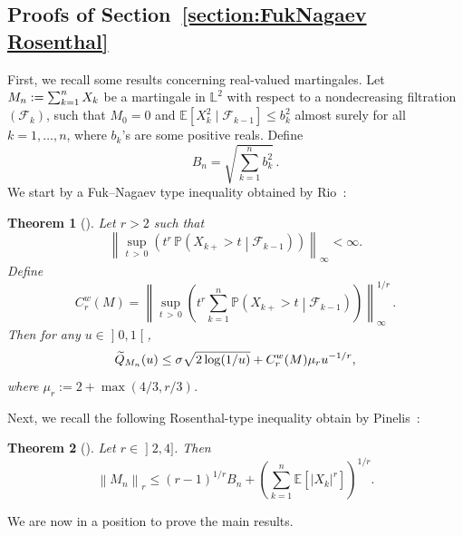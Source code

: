 \documentclass[10pt]{amsart}
\newtheorem{theo}{Theorem}[section]
\theoremstyle{definition}\newtheorem{defi}[theo]{Definition}\newtheorem{rema}[theo]{Remark}\newtheorem{exam}[theo]{Example}\newtheorem{exem}[theo]{Example}\newtheorem{nota}[theo]{Notation}
\newcommand{\bE}{\mathbb{E}}
\newcommand{\bL}{\mathbb{L}}
\newcommand{\bP}{\mathbb{P}}
\newcommand{\cF}{\mathcal{F}}
\newcommand{\intervalleoo}[2]{\mathopen{]} #1\mathclose{}\mathpunct{},#2\mathclose{[}}
\newcommand{\intervalleof}[2]{\mathopen{]} #1\mathclose{}\mathpunct{},#2\mathclose{]}}
\let\oldtilde\tilde
\renewcommand*{\tilde}[1]{\mathchoice{\widetilde{#1}}{\widetilde{#1}}{\oldtilde{#1}}{\oldtilde{#1}}}
\begin{document}
\subsection{Proofs of Section~\ref{section:FukNagaev Rosenthal}}

First, we recall some results concerning real-valued martingales. Let $M_n:=\sum_{k=1}^n \linebreak X_k$ be a martingale in $\bL^2$ with respect to a nondecreasing filtration $(\cF_k)$, such that $M_0=0$ and $\bE[X_k^2\mid\cF_{k-1}]\leq b_k^2$ almost surely for all $k=1,\ldots,n$, where $b_k$'s are some positive reals. Define
\[
B_n=\sqrt{\sum_{k=1}^n b_k^2}\,.
\]
We start by a Fuk--Nagaev type inequality obtained by Rio~\cite{Rio17a}:
\begin{theo}[{\cite[Theorem~4.1]{Rio17a}}]\label{thm:Fuk-Nagaev Rio}
Let $r>2$ such that
\[
\left\|\sup_{t\,>\,0}\left(t^r\,\bP(X_{k+}>t\middle|\cF_{k-1})\right)\right\|_\infty<\infty.
\]
Define
\[
C_r^w(M)=\left\|\sup_{t\,>\,0}\left(t^r\sum_{k=1}^n\bP\left(X_{k+}>t\middle|\cF_{k-1}\right)\right)\right\|_\infty^{1/r}\,.
\]
Then for any $u\in \intervalleoo 01$,
\begin{equation*}
\tilde{Q}_{M_n}(u)\leq \sigma\sqrt{2\log(1/u)}+C_r^w(M)\mu_r u^{-1/r},
\end{equation*}
where $\mu_r:=2+\max(4/3,r/3)$.
\end{theo}

Next, we recall the following Rosenthal-type inequality obtain by Pinelis~\cite{Pinelis15}:
\begin{theo}[{\cite[Theorem~1 and inequality (10)]{Pinelis15}}]\label{thm:Rosenthal Pinelis}
Let $r\in\intervalleof 24$. Then
\[
\left\|M_n\right\|_r\leq (r-1)^{1/r} B_n + \left(\sum_{k=1}^n\bE\left[|X_k|^r\right]\right)^{1/r}.
\]
\end{theo}

We are now in a position to prove the main results.
\end{document}
